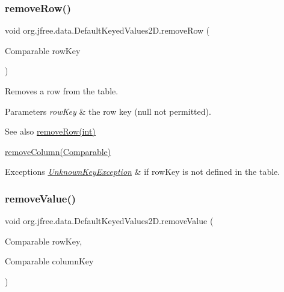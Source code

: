 \subsubsection{\texorpdfstring{remove\+Row()}{removeRow()}\hspace{0.1cm}{\footnotesize\ttfamily [2/2]}}
{\footnotesize\ttfamily void org.\+jfree.\+data.\+Default\+Keyed\+Values2\+D.\+remove\+Row (\begin{DoxyParamCaption}\item[{Comparable}]{row\+Key }\end{DoxyParamCaption})}

Removes a row from the table.


\begin{DoxyParams}{Parameters}
{\em row\+Key} & the row key ({\ttfamily null} not permitted).\\
\hline
\end{DoxyParams}
\begin{DoxySeeAlso}{See also}
\mbox{\hyperlink{classorg_1_1jfree_1_1data_1_1_default_keyed_values2_d_ad0ba13bb6997d580f816f62297d7ef96}{remove\+Row(int)}} 

\mbox{\hyperlink{classorg_1_1jfree_1_1data_1_1_default_keyed_values2_d_a39f5509250ab63ae4c34f1d68767cc82}{remove\+Column(\+Comparable)}}
\end{DoxySeeAlso}

\begin{DoxyExceptions}{Exceptions}
{\em \mbox{\hyperlink{classorg_1_1jfree_1_1data_1_1_unknown_key_exception}{Unknown\+Key\+Exception}}} & if {\ttfamily row\+Key} is not defined in the table. \\
\hline
\end{DoxyExceptions}
\mbox{\label{classorg_1_1jfree_1_1data_1_1_default_keyed_values2_d_a2bc7617889df5d3977fff377c0ddceb7}} 
\subsubsection{\texorpdfstring{remove\+Value()}{removeValue()}}
{\footnotesize\ttfamily void org.\+jfree.\+data.\+Default\+Keyed\+Values2\+D.\+remove\+Value (\begin{DoxyParamCaption}\item[{Comparable}]{row\+Key,  }\item[{Comparable}]{column\+Key }\end{DoxyParamCaption})}


